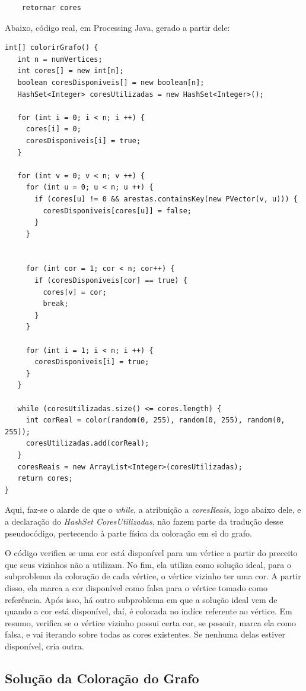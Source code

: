\documentclass[
	12pt,				%
	oneside,			%
	a4paper,			%
	english,			%
	brazil,				%
	]{abntex2}
\begin{document}
{\begin{verbatim}
    retornar cores
\end{verbatim}

Abaixo, código real, em Processing Java, gerado a partir dele:

\begin{verbatim}
int[] colorirGrafo() {
   int n = numVertices;
   int cores[] = new int[n];
   boolean coresDisponiveis[] = new boolean[n];
   HashSet<Integer> coresUtilizadas = new HashSet<Integer>();

   for (int i = 0; i < n; i ++) {
     cores[i] = 0;
     coresDisponiveis[i] = true;
   }

   for (int v = 0; v < n; v ++) {
     for (int u = 0; u < n; u ++) {
       if (cores[u] != 0 && arestas.containsKey(new PVector(v, u))) {
         coresDisponiveis[cores[u]] = false;
       }
     }


     for (int cor = 1; cor < n; cor++) {
       if (coresDisponiveis[cor] == true) {
         cores[v] = cor;
         break;
       }
     }

     for (int i = 1; i < n; i ++) {
       coresDisponiveis[i] = true;
     }
   }

   while (coresUtilizadas.size() <= cores.length) {
     int corReal = color(random(0, 255), random(0, 255), random(0, 255));
     coresUtilizadas.add(corReal);
   }
   coresReais = new ArrayList<Integer>(coresUtilizadas);
   return cores;
}    
\end{verbatim}

Aqui, faz-se o alarde de que o \textit{while}, a atribuição a \textit{coresReais}, logo abaixo dele, e a declaração do \textit{HashSet CoresUtilizadas}, não fazem parte da tradução desse pseudocódigo, pertecendo à parte física da coloração em si do grafo.

O código verifica se uma cor está disponível para um vértice a partir do preceito que seus vizinhos não a utilizam. No fim, ela utiliza como solução ideal, para o subproblema da coloração de cada vértice, o vértice vizinho ter uma cor. A partir disso, ela marca a cor disponível como falsa para o vértice tomado como referência. Após isso, há outro subproblema em que a solução ideal vem de quando a cor está disponível, daí, é colocada no indíce referente ao vértice. Em resumo, verifica se o vértice vizinho possui certa cor, se possuir, marca ela como falsa, e vai iterando sobre todas as cores existentes. Se nenhuma delas estiver disponível, cria outra.

\subsection{Solução da Coloração do Grafo}

}
\end{document}
